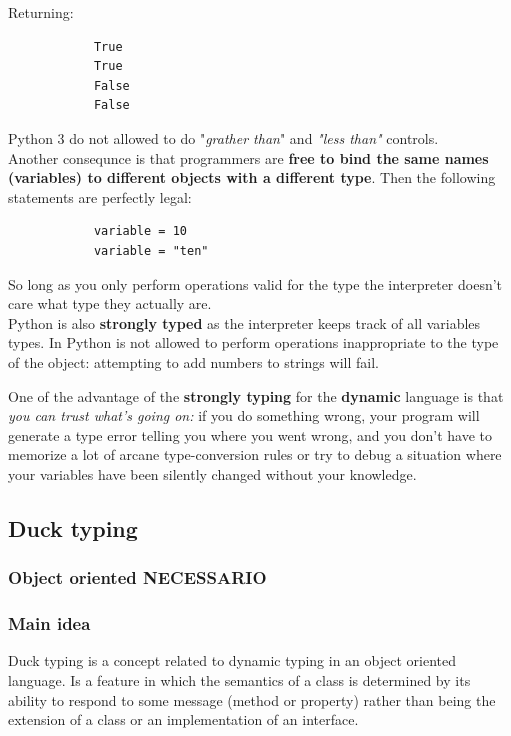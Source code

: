\documentclass[12pt]{article}
\begin{document}
		Returning:
		
		\begin{lstlisting}
			True
			True
			False
			False
		\end{lstlisting}
		
		Python 3 do not allowed to do "\textit{grather than}" and \textit{"less than"} controls.\\
		
		Another consequnce is that programmers are \textbf{free to bind the same names (variables) to different objects with a different type}. Then the following statements are perfectly legal:
		
		\begin{lstlisting}
			variable = 10
			variable = "ten"
		\end{lstlisting}
		
		So long as you only perform operations valid for the type the interpreter doesn't care what type they actually are. \\
		
		Python is also \textbf{strongly typed} as the interpreter keeps track of all variables types. In Python is not allowed to perform operations inappropriate to the type of the object: attempting to add numbers to strings will fail.
		
		One of the advantage of the \textbf{strongly typing} for the \textbf{dynamic} language is that \textit{you can trust what's going on:} if you do something wrong, your program will generate a type error telling you where you went wrong, and you don't have to memorize a lot of arcane type-conversion rules or try to debug a situation where your variables have been silently changed without your knowledge. 
		
	\subsection{Duck typing}
	
		\subsubsection{Object oriented NECESSARIO}
		
		\subsubsection{Main idea}
			
			Duck typing is a concept related to dynamic typing in an object oriented language. Is a feature in which the semantics of a class is determined by its ability to respond to some message (method or property) rather than being the extension of a class or an implementation of an interface. \\
\end{document}
